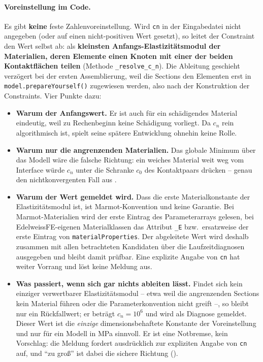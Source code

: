 \documentclass[a4paper,11pt]{article}
\newcommand{\code}[1]{\texttt{\small #1}}
\begin{document}
\paragraph{Voreinstellung im Code.} Es gibt \textbf{keine} feste Zahlenvoreinstellung. Wird
\code{cn} in der Eingabedatei nicht angegeben (oder auf einen nicht-positiven Wert gesetzt), so
leitet der Constraint den Wert selbst ab: als \textbf{kleinsten Anfangs-Elastizitätsmodul der
Materialien, deren Elemente einen Knoten mit einer der beiden Kontaktflächen teilen} (Methode
\code{\_resolve\_c\_n}). Die Ableitung geschieht verzögert bei der ersten Assemblierung, weil die
Sections den Elementen erst in \code{model.prepareYourself()} zugewiesen werden, also nach der
Konstruktion der Constraints. Vier Punkte dazu:

\begin{itemize}
  \item \textbf{Warum der Anfangswert.} Er ist auch für ein schädigendes Material eindeutig, weil zu
        Rechenbeginn keine Schädigung vorliegt. Da $c_n$ rein algorithmisch ist, spielt seine spätere
        Entwicklung ohnehin keine Rolle.
  \item \textbf{Warum nur die angrenzenden Materialien.} Das globale Minimum über das Modell wäre die
        falsche Richtung: ein weiches Material weit weg vom Interface würde $c_n$ unter die Schranke
        $c_0$ des Kontaktpaars drücken -- genau den nichtkonvergenten Fall aus
        \citet[Abschn.~7]{hueber2005}.
  \item \textbf{Warum der Wert gemeldet wird.} Dass die erste Materialkonstante der
        Elastizitätsmodul ist, ist Marmot-Konvention und keine Garantie. Bei Marmot-Materialien
        wird der erste Eintrag des Parameterarrays gelesen, bei EdelweissFE-eigenen
        Materialklassen das Attribut \code{\_E} bzw.\ ersatzweise der erste Eintrag von
        \code{materialProperties}. Der abgeleitete Wert wird deshalb zusammen mit allen
        betrachteten Kandidaten über die Laufzeitdiagnosen ausgegeben und bleibt damit prüfbar.
        Eine explizite Angabe von \code{cn} hat weiter Vorrang und löst keine Meldung aus.
  \item \textbf{Was passiert, wenn sich gar nichts ableiten lässt.} Findet sich kein einziger
        verwertbarer Elastizitätsmodul -- etwa weil die angrenzenden Sections kein Material
        führen oder die Parameterkonvention nicht greift --, so bleibt nur ein Rückfallwert;
        er beträgt $c_n = 10^{6}$ und wird als Diagnose gemeldet. Dieser Wert ist die
        \emph{einzige} dimensionsbehaftete Konstante der Voreinstellung und nur für ein Modell in
        MPa sinnvoll. Er ist eine Notbremse, kein Vorschlag: die Meldung fordert ausdrücklich zur
        expliziten Angabe von \code{cn} auf, und ``zu groß'' ist dabei die sichere Richtung
        (\citealp[Abschn.~7]{hueber2005}).
\end{itemize}
\end{document}
